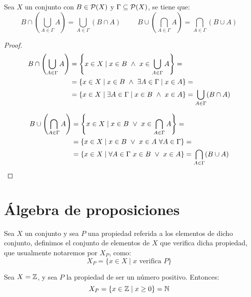 \begin{prop}
    Sea $X$ un conjunto con $B \in \mathcal{P}(X)$ y $\Gamma \subseteq \mathcal{P}(X)$, se tiene que:
    \begin{equation*}
        B \cap \left( \bigcup_{A \in \Gamma}A \right) = \bigcup_{A\in \Gamma} (B \cap A)
        \hspace{1cm}
        B \cup \left( \bigcap_{A \in \Gamma}A \right) = \bigcap_{A\in \Gamma} (B \cup A)
    \end{equation*}
\end{prop}
\begin{proof}
    \begin{equation*}
        \begin{split}
            B \cap \left( \bigcup_{A \in \Gamma}A \right) &= \left\{ x \in X \mid x \in B \ \land \  x \in \bigcup_{A \in \Gamma}A \right\} =\\
            & = \{x \in X \mid x \in B \ \land \  \exists A \in \Gamma \mid x \in A\} =\\
            & =\{x \in X \mid \exists A \in \Gamma \mid x \in B \ \land \  x \in A\}= \bigcup_{A\in \Gamma} (B \cap A)
        \end{split}
    \end{equation*}

    \begin{equation*}
        \begin{split}
            B \cup \left( \bigcap_{A \in \Gamma}A \right) &= \left\{ x \in X \mid x \in B \ \lor \  x \in \bigcap_{A \in \Gamma}A \right\} =\\
            & = \{x \in X \mid x \in B \ \lor \  x \in A~\forall A \in \Gamma\} =\\
            & = \{x \in X \mid \forall A \in \Gamma~x \in B \ \lor \  x \in A\} = \bigcap_{A\in \Gamma} (B \cup A)
        \end{split}
    \end{equation*}
\end{proof}


\section{Álgebra de proposiciones}
\begin{definicion}
    Sea $X$ un conjunto y sea $P$ una propiedad referida a los elementos de dicho conjunto, definimos el conjunto de elementos de $X$ que verifica dicha propiedad, que usualmente notaremos por $X_P$, como:
    $$X_P = \{x \in X \mid x \mbox{ verifica } P \}$$
\end{definicion}
\begin{ejemplo}
    Sea $X=\mathbb{Z}$, y sea $P$ la propiedad de ser un número positivo. Entonces:
    \begin{equation*}
        X_P = \{x\in \mathbb{Z}\mid x\geq 0\} = \mathbb{N}
    \end{equation*}
\end{ejemplo}

